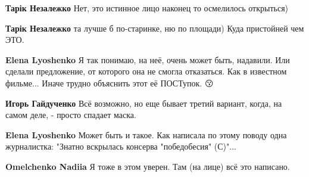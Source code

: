 \begin{itemize}
\begin{itemize}
 
\textbf{Тарік Незалежко}
Нет, это истинное лицо наконец то осмелилось открыться)

 
\textbf{Тарік Незалежко} та лучше б по-старинке, ню по площади) Куда пристойней чем ЭТО.

 
\textbf{Elena Lyoshenko} Я так понимаю, на неё, очень может быть, надавили. Или сделали предложение, от которого она не смогла отказаться. Как в известном фильме... Иначе трудно объяснить этот её ПОСТупок. 😗

 

\textbf{Игорь Гайдученко}
Всё возможно, но еще бывает третий вариант, когда, на самом деле, - просто спадает маска.

 
\textbf{Elena Lyoshenko} Может быть и такое. Как написала по этому поводу одна журналистка: "Знатно вскрылась консерва "победобесия" (С)"...

 
\textbf{Omelchenko Nadiia} Я тоже в этом уверен. Там (на лице) всё это написано.


\end{itemize}
\end{itemize}
